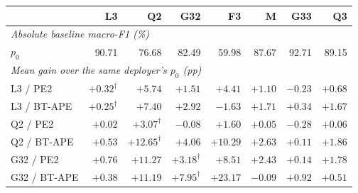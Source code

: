 \begin{tabular}{lrrrrrrr}
\toprule
 & L3 & Q2 & G32 & F3 & M & G33 & Q3 \\
\midrule
\multicolumn{8}{l}{\textit{Absolute baseline macro-F1 (\%)}} \\
$p_0$ & 90.71 & 76.68 & 82.49 & 59.98 & 87.67 & 92.71 & 89.15 \\
\midrule
\multicolumn{8}{l}{\textit{Mean gain over the same deployer's $p_0$ (pp)}} \\
L3 / PE2 & $+0.32^{\dagger}$ & $+5.74$ & $+1.51$ & $+4.41$ & $+1.10$ & $-0.23$ & $+0.68$ \\
L3 / BT-APE & $+0.25^{\dagger}$ & $+7.40$ & $+2.92$ & $-1.63$ & $+1.71$ & $+0.34$ & $+1.67$ \\
Q2 / PE2 & $+0.02$ & $+3.07^{\dagger}$ & $-0.08$ & $+1.60$ & $+0.05$ & $-0.28$ & $+0.06$ \\
Q2 / BT-APE & $+0.53$ & $+12.65^{\dagger}$ & $+4.06$ & $+10.29$ & $+2.63$ & $+0.11$ & $+1.86$ \\
G32 / PE2 & $+0.76$ & $+11.27$ & $+3.18^{\dagger}$ & $+8.51$ & $+2.43$ & $+0.14$ & $+1.78$ \\
G32 / BT-APE & $+0.38$ & $+11.19$ & $+7.95^{\dagger}$ & $+23.17$ & $-0.09$ & $+0.92$ & $+0.51$ \\
\bottomrule
\end{tabular}
